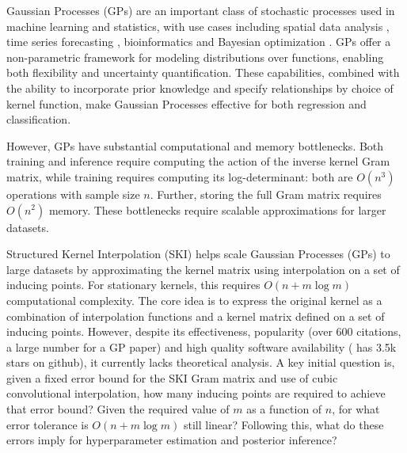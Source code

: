 Gaussian Processes (GPs) \citep{kolmogorov1940wienersche,rasmussen2006gaussian} are an important class of stochastic processes used in machine learning and statistics, with use cases including spatial data analysis \citep{liu2021missing}, time series forecasting \citep{girard2002gaussian}, bioinformatics \citep{luo2023diseasegps} and Bayesian optimization \citep{frazier2018tutorial}. GPs offer a non-parametric framework for modeling distributions over functions, enabling both flexibility and uncertainty quantification. These capabilities, combined with the ability to incorporate prior knowledge and specify relationships by choice of kernel function, make Gaussian Processes effective for both regression and classification.

However, GPs have substantial computational and memory bottlenecks. Both training and inference require computing the action of the inverse kernel Gram matrix, while training requires computing its log-determinant: both are $O(n^3)$ operations with sample size $n$. Further, storing the full Gram matrix requires $O(n^2)$ memory. These bottlenecks require scalable approximations for larger datasets.

Structured Kernel Interpolation (SKI) \cite{wilson2015kernel} helps scale Gaussian Processes (GPs) to large datasets by approximating the kernel matrix using interpolation on a set of inducing points. For stationary kernels, this requires $O(n+m \log m)$ computational complexity. The core idea is to express the original kernel as a combination of interpolation functions and a kernel matrix defined on a set of inducing points. However, despite its effectiveness, popularity (over $600$ citations, a large number for a GP paper) and high quality software availability (\cite{gardner2018gpytorch} has 3.5k stars on github), it currently lacks theoretical analysis. A key initial question is, given a fixed error bound for the SKI Gram matrix and use of cubic convolutional interpolation, how many inducing points are required to achieve that error bound? Given the required value of $m$ as a function of $n$, for what error tolerance is $O(n+m\log m)$ still linear? Following this, what do these errors imply for hyperparameter estimation and posterior inference?

